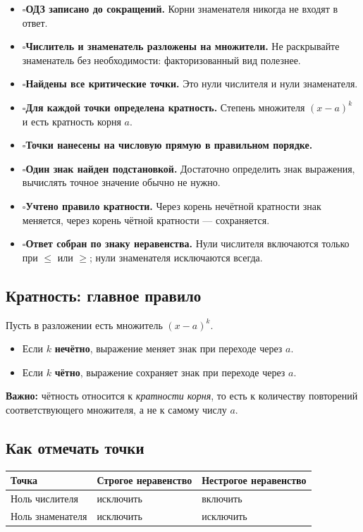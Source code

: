 \documentclass[a4paper,12pt]{article}
\newcommand{\checkitem}{\(\square\)\hspace{0.45em}}
\newcommand{\important}[1]{\textcolor{darkaccent}{\textbf{#1}}}
\begin{document}
\begin{itemize}
  \item \checkitem \textbf{ОДЗ записано до сокращений.} Корни знаменателя никогда не входят в ответ.
  \item \checkitem \textbf{Числитель и знаменатель разложены на множители.} Не раскрывайте знаменатель без необходимости: факторизованный вид полезнее.
  \item \checkitem \textbf{Найдены все критические точки.} Это нули числителя и нули знаменателя.
  \item \checkitem \textbf{Для каждой точки определена кратность.} Степень множителя \((x-a)^k\) и есть кратность корня \(a\).
  \item \checkitem \textbf{Точки нанесены на числовую прямую в правильном порядке.}
  \item \checkitem \textbf{Один знак найден подстановкой.} Достаточно определить знак выражения, вычислять точное значение обычно не нужно.
  \item \checkitem \textbf{Учтено правило кратности.} Через корень нечётной кратности знак меняется, через корень чётной кратности --- сохраняется.
  \item \checkitem \textbf{Ответ собран по знаку неравенства.} Нули числителя включаются только при \(\le\) или \(\ge\); нули знаменателя исключаются всегда.
\end{itemize}

\subsection*{Кратность: главное правило}
Пусть в разложении есть множитель \((x-a)^k\).
\begin{itemize}
  \item Если \(k\) \textbf{нечётно}, выражение меняет знак при переходе через \(a\).
  \item Если \(k\) \textbf{чётно}, выражение сохраняет знак при переходе через \(a\).
\end{itemize}

\important{Важно:} чётность относится к \emph{кратности корня}, то есть к количеству повторений соответствующего множителя, а не к самому числу \(a\).

\subsection*{Как отмечать точки}
\begin{center}
\renewcommand{\arraystretch}{1.25}
\begin{tabularx}{0.94\linewidth}{@{}X X X@{}}
\toprule
\textbf{Точка} & \textbf{Строгое неравенство} & \textbf{Нестрогое неравенство} \\
\midrule
Ноль числителя & исключить & включить \\
Ноль знаменателя & исключить & исключить \\
\bottomrule
\end{tabularx}
\end{center}
\end{document}

